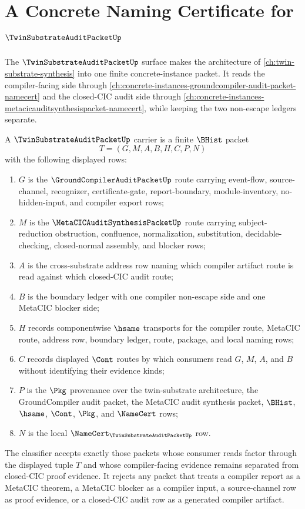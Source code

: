 \chapter{A Concrete Naming Certificate for $\TwinSubstrateAuditPacketUp$}
\label{ch:concrete-instances-twin-substrate-audit-packet-namecert}

The $\TwinSubstrateAuditPacketUp$ surface makes the architecture of \autoref{ch:twin-substrate-synthesis} into one finite concrete-instance packet. It reads the compiler-facing side through \autoref{ch:concrete-instances-groundcompiler-audit-packet-namecert} and the closed-CIC audit side through \autoref{ch:concrete-instances-metacicauditsynthesispacket-namecert}, while keeping the two non-escape ledgers separate.

\begin{definition}
\label{def:twin-substrate-audit-packet}
A $\TwinSubstrateAuditPacketUp$ carrier is a finite $\BHist$ packet
$$
T=(G,M,A,B,H,C,P,N)
$$
with the following displayed rows:
\begin{enumerate}
\item $G$ is the $\GroundCompilerAuditPacketUp$ route carrying event-flow, source-channel, recognizer, certificate-gate, report-boundary, module-inventory, no-hidden-input, and compiler export rows;
\item $M$ is the $\MetaCICAuditSynthesisPacketUp$ route carrying subject-reduction obstruction, confluence, normalization, substitution, decidable-checking, closed-normal assembly, and blocker rows;
\item $A$ is the cross-substrate address row naming which compiler artifact route is read against which closed-CIC audit route;
\item $B$ is the boundary ledger with one compiler non-escape side and one MetaCIC blocker side;
\item $H$ records componentwise $\hsame$ transports for the compiler route, MetaCIC route, address row, boundary ledger, route, package, and local naming rows;
\item $C$ records displayed $\Cont$ routes by which consumers read $G$, $M$, $A$, and $B$ without identifying their evidence kinds;
\item $P$ is the $\Pkg$ provenance over the twin-substrate architecture, the GroundCompiler audit packet, the MetaCIC audit synthesis packet, $\BHist$, $\hsame$, $\Cont$, $\Pkg$, and $\NameCert$ rows;
\item $N$ is the local $\NameCert_{\TwinSubstrateAuditPacketUp}$ row.
\end{enumerate}
The classifier accepts exactly those packets whose consumer reads factor through the displayed tuple $T$ and whose compiler-facing evidence remains separated from closed-CIC proof evidence. It rejects any packet that treats a compiler report as a MetaCIC theorem, a MetaCIC blocker as a compiler input, a source-channel row as proof evidence, or a closed-CIC audit row as a generated compiler artifact.
\end{definition}

